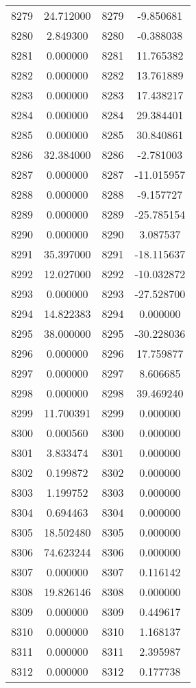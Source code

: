 \documentclass[12pt]{article}
\begin{document}
\begin{longtable}{@{}cccc@{}}
8279 & 24.712000 & 8279 & -9.850681 \\
8280 & 2.849300 & 8280 & -0.388038 \\
8281 & 0.000000 & 8281 & 11.765382 \\
8282 & 0.000000 & 8282 & 13.761889 \\
8283 & 0.000000 & 8283 & 17.438217 \\
8284 & 0.000000 & 8284 & 29.384401 \\
8285 & 0.000000 & 8285 & 30.840861 \\
8286 & 32.384000 & 8286 & -2.781003 \\
8287 & 0.000000 & 8287 & -11.015957 \\
8288 & 0.000000 & 8288 & -9.157727 \\
8289 & 0.000000 & 8289 & -25.785154 \\
8290 & 0.000000 & 8290 & 3.087537 \\
8291 & 35.397000 & 8291 & -18.115637 \\
8292 & 12.027000 & 8292 & -10.032872 \\
8293 & 0.000000 & 8293 & -27.528700 \\
8294 & 14.822383 & 8294 & 0.000000 \\
8295 & 38.000000 & 8295 & -30.228036 \\
8296 & 0.000000 & 8296 & 17.759877 \\
8297 & 0.000000 & 8297 & 8.606685 \\
8298 & 0.000000 & 8298 & 39.469240 \\
8299 & 11.700391 & 8299 & 0.000000 \\
8300 & 0.000560 & 8300 & 0.000000 \\
8301 & 3.833474 & 8301 & 0.000000 \\
8302 & 0.199872 & 8302 & 0.000000 \\
8303 & 1.199752 & 8303 & 0.000000 \\
8304 & 0.694463 & 8304 & 0.000000 \\
8305 & 18.502480 & 8305 & 0.000000 \\
8306 & 74.623244 & 8306 & 0.000000 \\
8307 & 0.000000 & 8307 & 0.116142 \\
8308 & 19.826146 & 8308 & 0.000000 \\
8309 & 0.000000 & 8309 & 0.449617 \\
8310 & 0.000000 & 8310 & 1.168137 \\
8311 & 0.000000 & 8311 & 2.395987 \\
8312 & 0.000000 & 8312 & 0.177738 \\

\end{longtable}
\end{document}
